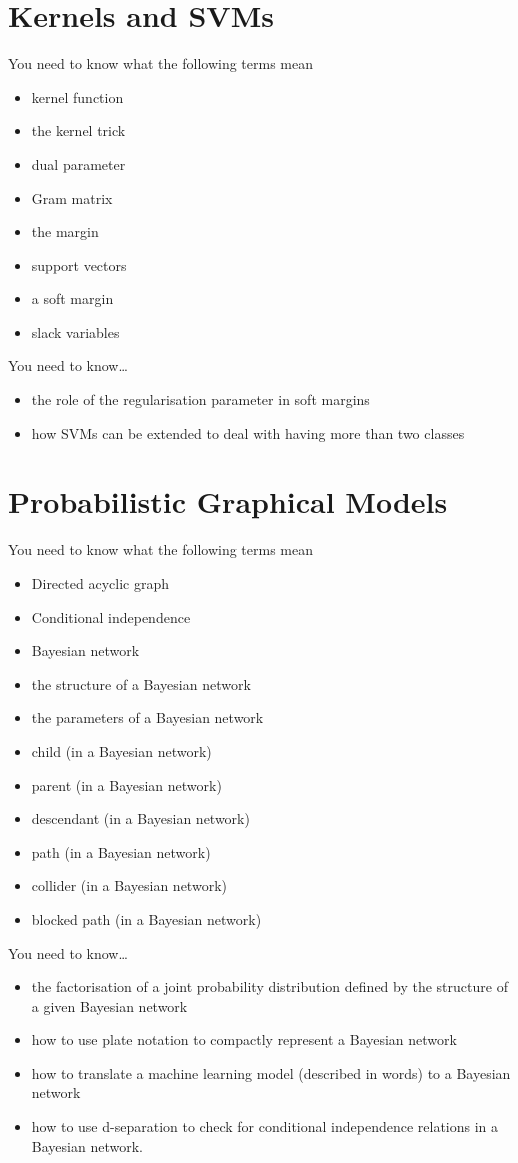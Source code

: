 \documentclass{article}
\newcommand{\yntk}{You need to know}
\begin{document}
\section{Kernels and SVMs}
\label{sec:kernels}

\yntk{} what the following terms mean
\begin{itemize}
\item kernel function
\item the kernel trick
\item dual parameter
\item Gram matrix
\item the margin
\item support vectors
\item a soft margin
\item slack variables
\end{itemize}

\yntk \dots
\begin{itemize}
\item the role of the regularisation parameter in soft margins
\item how SVMs can be extended to deal with having more than two classes
\end{itemize}

\section{Probabilistic Graphical Models}
\label{sec:pgms}

\yntk{} what the following terms mean
\begin{itemize}
\item Directed acyclic graph
\item Conditional independence
\item Bayesian network
\item the structure of a Bayesian network
\item the parameters of a Bayesian network
\item child (in a Bayesian network)
\item parent (in a Bayesian network)
\item descendant (in a Bayesian network)
\item path (in a Bayesian network)
\item collider (in a Bayesian network)
\item blocked path (in a Bayesian network)
\end{itemize}

\yntk \dots
\begin{itemize}
\item the factorisation of a joint probability distribution defined by
  the structure of a given Bayesian network
\item how to use plate notation to compactly represent a Bayesian network
\item how to translate a machine learning model (described in words)
  to a Bayesian network
\item how to use d-separation to check for conditional independence
  relations in a Bayesian network.
\end{itemize}
\end{document}
